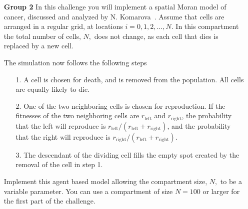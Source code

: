 \documentclass[12pt]{article}
\begin{document}
\begin{enumerate}
\item[\bf Group 2] In this challenge you will implement a spatial Moran model of cancer,  
discussed and analyzed by N. Komarova~\cite{komarova06}.
Assume that cells  are arranged in a regular grid, at locations $i = 0, 1, 2, \ldots , N$. 
In this compartment the total number of cells, $N,$ does not change, as each cell that dies
is replaced by a new cell. 

The simulation now follows the following steps
\begin{enumerate} 
\item[1.] A cell is chosen for death, and is removed from the population.
All cells are equally likely to die.
\item[2.] One of the two neighboring cells is chosen for reproduction. 
If the fitnesses of the two neighboring cells are $r_{\text{left}}$ and $r_{\text{right}}$, the 
probability that the left will reproduce is $r_{\text{left}}/(r_{\text{left}}+ r_{\text{right}})$, 
and the probability that the right will reproduce is $r_{\text{right}}/(r_{\text{left}}+ r_{\text{right}})$.
\item[3.] The
descendant of the dividing cell fills the empty spot created by the removal of the cell in step 1. 
\end{enumerate} 
 Implement this agent based model allowing the compartment size, $N,$ to be a variable parameter.  
You can use a compartment of size $N = 100$ or larger for the first part of the challenge. 


\end{enumerate}
\end{document}
